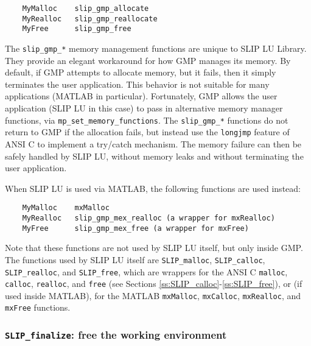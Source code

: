 \documentclass[11pt]{article}
\theoremstyle{definition}
\begin{document}
\begin{mdframed}[userdefinedwidth=6in]
{\footnotesize
\begin{verbatim}
    MyMalloc    slip_gmp_allocate
    MyRealloc   slip_gmp_reallocate
    MyFree      slip_gmp_free
\end{verbatim}
} \end{mdframed}

The \verb|slip_gmp_*| memory management functions are unique to SLIP LU
Library.  They provide an elegant workaround for how GMP manages its memory.
By default, if GMP attempts to allocate memory, but it fails, then it simply
terminates the user application.  This behavior is not suitable for many
applications (MATLAB in particular).  Fortunately, GMP allows the user
application (SLIP LU in this case) to pass in alternative memory manager
functions, via \verb|mp_set_memory_functions|.  The \verb|slip_gmp_*| functions
do not return to GMP if the allocation fails, but instead use the
\verb|longjmp| feature of ANSI C to implement a try/catch mechanism.  The
memory failure can then be safely handled by SLIP LU, without memory leaks and
without terminating the user application.

When SLIP LU is used via MATLAB, the following functions are used instead:

\begin{mdframed}[userdefinedwidth=6in]
{\footnotesize
\begin{verbatim}
    MyMalloc    mxMalloc
    MyRealloc   slip_gmp_mex_realloc (a wrapper for mxRealloc)
    MyFree      slip_gmp_mex_free (a wrapper for mxFree)
\end{verbatim}
} \end{mdframed}

Note that these functions are not used by SLIP LU itself, but only inside GMP.
The functions used by SLIP LU itself are \verb|SLIP_malloc|,
\verb|SLIP_calloc|, \verb|SLIP_realloc|, and \verb|SLIP_free|, which are
wrappers for the ANSI C \verb|malloc|, \verb|calloc|, \verb|realloc|, and
\verb|free| (see Sections \ref{ss:SLIP_calloc}-\ref{ss:SLIP_free}), or (if used
inside MATLAB), for the MATLAB \verb|mxMalloc|, \verb|mxCalloc|,
\verb|mxRealloc|, and \verb|mxFree| functions.

\cprotect\subsubsection{\verb|SLIP_finalize|: free the working environment}
\label{ss:SLIP_finalize}
\end{document}
